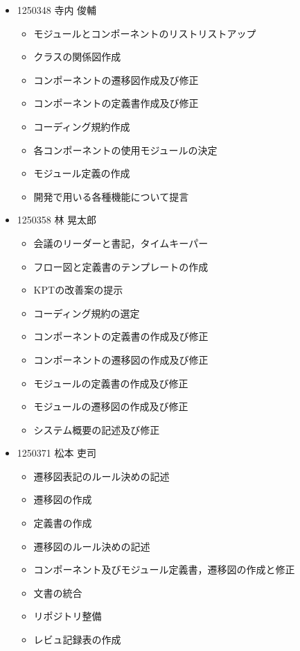 \documentclass[a4paper, titlepage]{jsarticle}
\begin{document}
\begin{itemize}
\item 1250348 寺内 俊輔
  \begin{itemize}
  \item モジュールとコンポーネントのリストリストアップ
  \item クラスの関係図作成
  \item コンポーネントの遷移図作成及び修正
  \item コンポーネントの定義書作成及び修正
  \item コーディング規約作成
  \item 各コンポーネントの使用モジュールの決定
  \item モジュール定義の作成
  \item 開発で用いる各種機能について提言
  \end{itemize}

\item 1250358 林 晃太郎
  \begin{itemize}
  \item 会議のリーダーと書記，タイムキーパー
  \item フロー図と定義書のテンプレートの作成
  \item KPTの改善案の提示
  \item コーディング規約の選定
  \item コンポーネントの定義書の作成及び修正
  \item コンポーネントの遷移図の作成及び修正
  \item モジュールの定義書の作成及び修正
  \item モジュールの遷移図の作成及び修正
  \item システム概要の記述及び修正
  \end{itemize}

\item 1250371 松本 吏司
  \begin{itemize}
  \item 遷移図表記のルール決めの記述
  \item 遷移図の作成
  \item 定義書の作成
  \item 遷移図のルール決めの記述
  \item コンポーネント及びモジュール定義書，遷移図の作成と修正
  \item 文書の統合
  \item リポジトリ整備
  \item レビュ記録表の作成
  \end{itemize}
\end{itemize}


\end{document}
